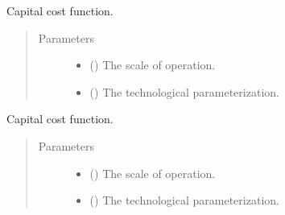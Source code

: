 \documentclass[letterpaper,10pt,english]{sphinxmanual}
\begin{document}
\begin{fulllineitems}
\label{\detokenize{technology:technology.tutorial_basic.capital_cost}}
Capital cost function.
\begin{quote}\begin{description}
\item[{Parameters}] \leavevmode\begin{itemize}
\item {} 
 () \textendash{} The scale of operation.

\item {} 
 () \textendash{} The technological parameterization.

\end{itemize}

\end{description}\end{quote}

\end{fulllineitems}


\begin{fulllineitems}
\label{\detokenize{technology:technology.tutorial_basic.fixed_cost}}
Capital cost function.
\begin{quote}\begin{description}
\item[{Parameters}] \leavevmode\begin{itemize}
\item {} 
 () \textendash{} The scale of operation.

\item {} 
 () \textendash{} The technological parameterization.

\end{itemize}

\end{description}\end{quote}

\end{fulllineitems}
\end{document}

